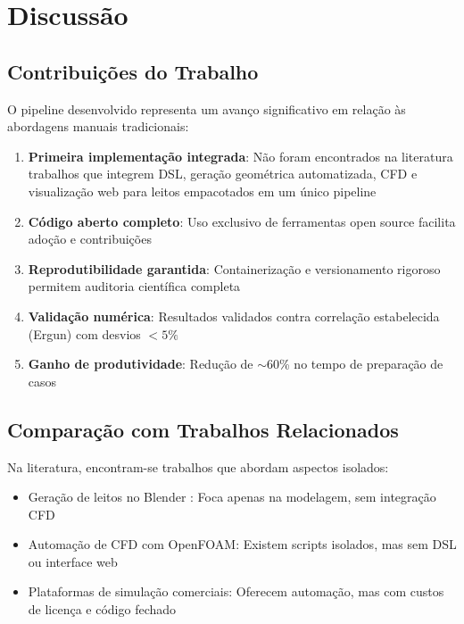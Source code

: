 \section{Discussão}

\subsection{Contribuições do Trabalho}

O pipeline desenvolvido representa um avanço significativo em relação às abordagens manuais tradicionais:

\begin{enumerate}
    \item \textbf{Primeira implementação integrada}: Não foram encontrados na literatura trabalhos que integrem DSL, geração geométrica automatizada, CFD e visualização web para leitos empacotados em um único pipeline
    
    \item \textbf{Código aberto completo}: Uso exclusivo de ferramentas open source facilita adoção e contribuições
    
    \item \textbf{Reprodutibilidade garantida}: Containerização e versionamento rigoroso permitem auditoria científica completa
    
    \item \textbf{Validação numérica}: Resultados validados contra correlação estabelecida (Ergun) com desvios $< 5\%$
    
    \item \textbf{Ganho de produtividade}: Redução de $\sim$60\% no tempo de preparação de casos
\end{enumerate}

\subsection{Comparação com Trabalhos Relacionados}

Na literatura, encontram-se trabalhos que abordam aspectos isolados:

\begin{itemize}
    \item Geração de leitos no Blender \cite{mdpi2021}: Foca apenas na modelagem, sem integração CFD
    \item Automação de CFD com OpenFOAM: Existem scripts isolados, mas sem DSL ou interface web
    \item Plataformas de simulação comerciais: Oferecem automação, mas com custos de licença e código fechado
\end{itemize}

